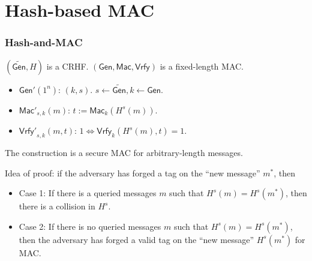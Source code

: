 \section{Hash-based MAC}
\begin{frame}\frametitle{Hash-and-MAC}
\begin{construction}
$(\widetilde{\mathsf{Gen}}, H)$ is a CRHF. $(\mathsf{Gen}, \mathsf{Mac}, \mathsf{Vrfy})$ is a fixed-length MAC.
\begin{itemize}
\item $\mathsf{Gen'}(1^n)$: $(k, s)$. $s \gets \widetilde{\mathsf{Gen}}, k \gets \mathsf{Gen}$.
\item $\mathsf{Mac'}_{s,k}(m)$: $t := \mathsf{Mac}_k(H^s(m))$.
\item $\mathsf{Vrfy'}_{s,k}(m,t)$: $1 \iff \mathsf{Vrfy}_{k}(H^s(m),t) = 1$.
\end{itemize}
\end{construction}
\begin{theorem}
The construction is a secure MAC for arbitrary-length messages.
\end{theorem}
Idea of proof: if the adversary has forged a tag on the ``new message'' $m^*$, then
\begin{itemize}
\item Case 1: If there is a queried messages $m$ such that $H^s(m) = H^s(m^*)$, then there is a collision in $H^s$.
\item Case 2: If there is no queried messages $m$ such that $H^s(m) = H^s(m^*)$, then the adversary has forged a valid tag on the ``new message'' $H^s(m^*)$ for MAC.
\end{itemize}
\end{frame}
